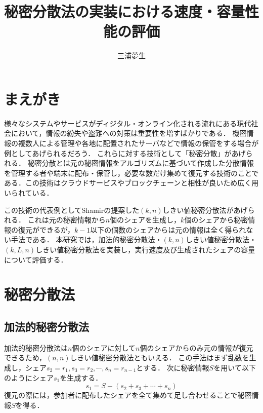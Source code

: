 \documentclass[twocolumn]{jarticle}
\begin{document}
\pagestyle{empty}

\date{}  %
\title{秘密分散法の実装における速度・容量性能の評価}
\author{三浦夢生}
\maketitle

\suppressfloats[t]


\section{まえがき}
様々なシステムやサービスがディジタル・オンライン化される流れにある現代社会において，情報の紛失や盗難への対策は重要性を増すばかりである．
%
機密情報の複数人による管理や各地に配置されたサーバなどで情報の保管をする場合が例としてあげられるだろう．
%
これらに対する技術として「秘密分散」があげられる．
%
秘密分散とは元の秘密情報をアルゴリズムに基づいて作成した分散情報を管理する者や端末に配布・保管し，必要な数だけ集めて復元する技術のことである．この技術はクラウドサービスやブロックチェーンと相性が良いため広く用いられている．

この技術の代表例としてShamirの提案した$(k,n)$しきい値秘密分散法\cite{shamir}があげられる．
%
これは元の秘密情報から$n$個のシェアを生成し，$k$個のシェアから秘密情報の復元ができるが，$k-1$以下の個数のシェアからは元の情報は全く得られない手法である．
%
本研究では，加法的秘密分散法\cite{oohara}・$(k,n)$しきい値秘密分散法\cite{shamir}・$(k,L,n)しきい値秘密分散法$\cite{yamamoto}\cite{multiparty}を実装し，実行速度及び生成されたシェアの容量について評価する．


\section{秘密分散法}
\subsection{加法的秘密分散法\cite{oohara}}
加法的秘密分散法は$n$個のシェアに対して$n$個のシェアからのみ元の情報が復元できるため，$(n,n)$しきい値秘密分散法ともいえる．
%
この手法はまず乱数を生成し，シェア$s_{2}=r_{1},s_{3}=r_{2},{\cdots},s_{n}=r_{n-1}$とする．
%
次に秘密情報$S$を用いて以下のようにシェア$s_{1}$を生成する．
%
\begin{equation}
	s_{1}=S-(s_{2}+s_{3}+{\cdots}+s_{n})
\end{equation}
%
復元の際には，参加者に配布したシェアを全て集めて足し合わせることで秘密情報$S$を得る．
\end{document}
